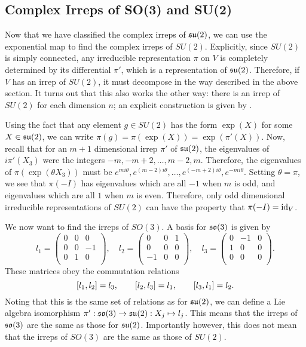 \documentclass[a4paper]{article}
\begin{document}
\subsection{Complex Irreps of SO(3) and SU(2)}

Now that we have classified the complex irreps of $\mathfrak{su}(2)$, we can use the exponential map to find the complex irreps of $SU(2)$. Explicitly, since $SU(2)$ is simply connected, any irreducible representation $\pi$ on $V$ is completely determined by its differential $\pi'$, which is a representation of $\mathfrak{su}(2)$. Therefore, if $V$ has an irrep of $SU(2)$, it must decompose in the way described in the above section. It turns out that this also works the other way: there is an irrep of $SU(2)$ for each dimension $n$; an explicit construction is given by \cite{woit}. 

Using the fact that any element $g \in SU(2)$ has the form $\exp(X)$ for some $X \in \mathfrak{su}(2)$, we can write $\pi(g) = \pi(\exp(X)) = \exp(\pi'(X))$. Now, recall that for an $m + 1$ dimensional irrep $\pi'$ of $\mathfrak{su}(2)$, the eigenvalues of $i\pi'(X_3)$ were the integers $-m, -m + 2, \hdots, m - 2, m$. Therefore, the eigenvalues of $\pi(\exp(\theta X_3))$ must be $e^{mi\theta}, e^{(m-2)i\theta}, \hdots, e^{(-m + 2)i\theta}, e^{-mi\theta}$. Setting $\theta = \pi$, we see that $\pi(-I)$ has eigenvalues which are all $-1$ when $m$ is odd, and eigenvalues which are all $1$ when $m$ is even. Therefore, only odd dimensional irreducible representations of $SU(2)$ can have the property that $\pi(-I) = \operatorname{id}_V$. 

We now want to find the irreps of $SO(3)$. A basis for $\mathfrak{so}(3)$ is given by 
$$l_1 = \begin{pmatrix} 0 & 0 & 0 \\ 0 & 0 & -1 \\ 0 & 1 & 0 \\ \end{pmatrix}, \hspace{1em} l_2 = \begin{pmatrix} 0 & 0 & 1 \\ 0 & 0 & 0 \\ -1 & 0 & 0 \\ \end{pmatrix}, \hspace{1em} l_3 = \begin{pmatrix} 0 & -1 & 0 \\ 1 & 0 & 0 \\ 0 & 0 & 0 \\ \end{pmatrix}.$$
These matrices obey the commutation relations
$$ \left[ l_1, l_2 \right] = l_3, \hspace{2em} \left[ l_2, l_3 \right] = l_1, \hspace{2em} \left[ l_3, l_1 \right] = l_2.$$
Noting that this is the same set of relations as for $\mathfrak{su}(2)$, we can define a Lie algebra isomorphism $\pi' : \mathfrak{so}(3) \to \mathfrak{su}(2) : X_j \mapsto l_j$. This means that the irreps of $\mathfrak{so}(3)$ are the same as those for $\mathfrak{su}(2)$. Importantly however, this does not mean that the irreps of $SO(3)$ are the same as those of $SU(2)$. 
\end{document}
